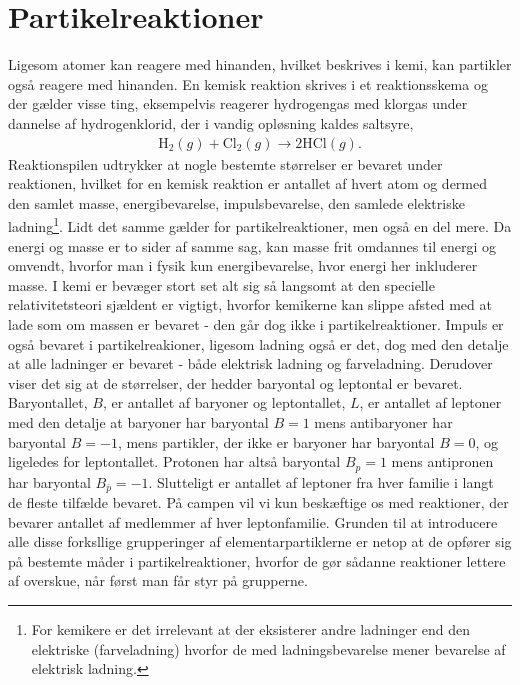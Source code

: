 \section{Partikelreaktioner} \label{sec:partikelreaktioner}
Ligesom atomer kan reagere med hinanden, hvilket beskrives i kemi, kan partikler også reagere med hinanden. En kemisk reaktion skrives i et reaktionsskema og der gælder visse ting, eksempelvis reagerer hydrogengas med klorgas under dannelse af hydrogenklorid, der i vandig opløsning kaldes saltsyre,
%
\begin{align}
    \mathrm{H}_2(g) + \mathrm{Cl}_2(g) \rightarrow 2 \mathrm{HCl}(g).
\end{align}
%
Reaktionspilen udtrykker at nogle bestemte størrelser er bevaret under reaktionen, hvilket for en kemisk reaktion er antallet af hvert atom og dermed den samlet masse, energibevarelse, impulsbevarelse, den samlede elektriske ladning\footnote{For kemikere er det irrelevant at der eksisterer andre ladninger end den elektriske (farveladning) hvorfor de med ladningsbevarelse mener bevarelse af elektrisk ladning.}. Lidt det samme gælder for partikelreaktioner, men også en del mere. Da energi og masse er to sider af samme sag, kan masse frit omdannes til energi og omvendt, hvorfor man i fysik kun energibevarelse, hvor energi her inkluderer masse. I kemi er bevæger stort set alt sig så langsomt at den specielle relativitetsteori sjældent er vigtigt, hvorfor kemikerne kan slippe afsted med at lade som om massen er bevaret - den går dog ikke i partikelreaktioner. Impuls er også bevaret i partikelreakioner, ligesom ladning også er det, dog med den detalje at alle ladninger er bevaret - både elektrisk ladning og farveladning. Derudover viser det sig at de størrelser, der hedder baryontal og leptontal er bevaret. Baryontallet, $B$, er antallet af baryoner og leptontallet, $L$, er antallet af leptoner med den detalje at baryoner har baryontal $B=1$ mens antibaryoner har baryontal $B=-1$, mens partikler, der ikke er baryoner har baryontal $B=0$, og ligeledes for leptontallet. Protonen har altså baryontal $B_p = 1$ mens antipronen har baryontal $B_{\bar{p}} = -1$. Slutteligt er antallet af leptoner fra hver familie i langt de fleste tilfælde bevaret. På campen vil vi kun beskæftige os med reaktioner, der bevarer antallet af medlemmer af hver leptonfamilie. Grunden til at introducere alle disse forksllige grupperinger af elementarpartiklerne er netop at de opfører sig på bestemte måder i partikelreaktioner, hvorfor de gør sådanne reaktioner lettere af overskue, når først man får styr på grupperne. \\

